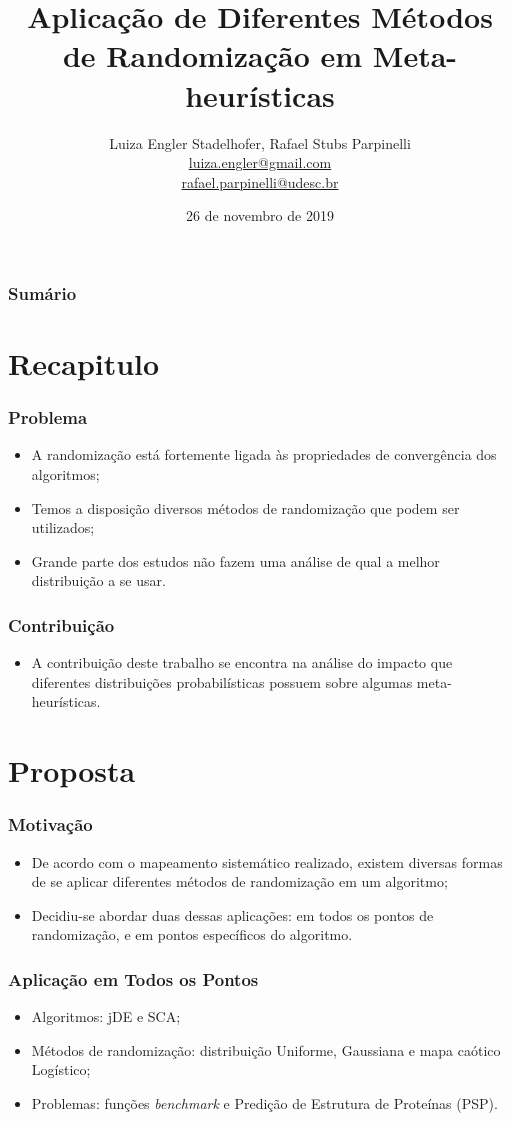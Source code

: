 \documentclass{beamer}
\title[Aplicação de Diferentes Métodos...]{Aplicação de Diferentes Métodos de Randomização em Meta-heurísticas}
\author[Luiza E. Stadelhofer, Rafael S. Parpinelli]{
    Luiza Engler Stadelhofer, Rafael Stubs Parpinelli\\\medskip
    {\small \url{luiza.engler@gmail.com}} \\ 
    {\small \url{rafael.parpinelli@udesc.br}}}
\institute[UDESC]{
        Departamento de Ci\^encia da Computa\c{c}\~ao \\
            Centro de Ci\^encias Tecnol\'ogicas\\
            Universidade do Estado de Santa Catarina}
\date{26 de novembro de 2019}
\begin{document}
\begin{frame}
\titlepage
\end{frame}

\begin{frame}
\frametitle{Sumário}
\tableofcontents
\end{frame}

\section{Recapitulo}

\begin{frame}
\frametitle{Problema}
\begin{itemize}
    \item A randomização está fortemente ligada às propriedades de convergência dos algoritmos;
    \item Temos a disposição diversos métodos de randomização que podem ser utilizados;
    \item Grande parte dos estudos não fazem uma análise de qual a melhor distribuição a se usar.
\end{itemize}
\end{frame}

\begin{frame}
\frametitle{Contribuição}
\begin{itemize}
    \item A contribuição deste trabalho se encontra na análise do impacto que diferentes distribuições probabilísticas possuem sobre algumas meta-heurísticas.
\end{itemize}
\end{frame}

\section{Proposta}

\begin{frame}
\frametitle{Motivação}
\begin{itemize}
    \item De acordo com o mapeamento sistemático realizado, existem diversas formas de se aplicar diferentes métodos de randomização em um algoritmo;
    \item Decidiu-se abordar duas dessas aplicações: em todos os pontos de randomização, e em pontos específicos do algoritmo.
\end{itemize}
\end{frame}

\begin{frame}
\frametitle{Aplicação em Todos os Pontos}
\begin{itemize}
    \item Algoritmos: jDE e SCA;
    \item Métodos de randomização: distribuição Uniforme, Gaussiana e mapa caótico Logístico;
    \item Problemas: funções \textit{benchmark} e Predição de Estrutura de Proteínas (PSP).
\end{itemize}
\end{frame}
\end{document}
